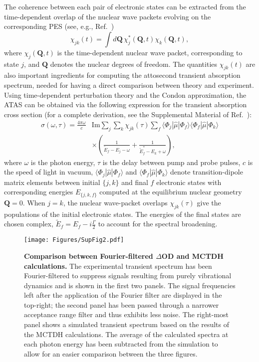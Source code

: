 \documentclass[12pt]{article}
\begin{document}
The coherence between each pair of electronic states can be extracted from the time-dependent overlap of the nuclear wave packets evolving on the corresponding PES (see, e.g., Ref.~\cite{despre2018charge})
%
\begin{equation}
\label{eq:coherence}
\chi_{jk}(t)=\int d \mathbf{Q}\, \chi^*_j(\mathbf{Q},t) \chi_k(\mathbf{Q},t),
\end{equation}  
%
where $\chi_j(\mathbf{Q},t)$ is the time-dependent nuclear wave packet, corresponding to state $j$, and $\mathbf{Q}$ denotes the nuclear degrees of freedom. The quantities $\chi_{jk}(t)$ are also important ingredients for computing the attosecond transient absorption spectrum, needed for having a direct comparison between theory and experiment. Using time-dependent perturbation theory and the Condon approximation, the ATAS can be obtained via the following expression for the transient absorption cross section (for a complete derivation, see the Supplemental Material of Ref.~\cite{golubev2020ATAS}): 
%
\begin{equation}
\label{eq:ATAS_cs}
\begin{split}
  \sigma (\omega,\tau) = \frac{4\pi\omega}{c} 
  & \text{Im} \sum_j \sum_k 
    \chi_{jk}(\tau)
    \sum_f \langle \Phi_j | \hat{\mu} | \Phi_f \rangle
           \langle \Phi_f | \hat{\mu} | \Phi_k \rangle \\ & \times \left(
      \frac{1}{\tilde{E}_f - E_j - \omega}
    + \frac{1}{\tilde{E}^*_f - E_k + \omega}
    \right),
\end{split}
\end{equation}
%
where $\omega$ is the photon energy, $\tau$ is the delay between pump and probe pulses, $c$ is the speed of light in vacuum, $\langle \Phi_j | \hat{\mu} | \Phi_f \rangle$ and $\langle \Phi_f | \hat{\mu} | \Phi_k \rangle$ denote transition-dipole matrix elements between initial $\{j,k\}$ and final $f$ electronic states with corresponding energies $E_{\{j,k,f\}}$ computed at the equilibrium nuclear geometry $\mathbf{Q}=0$. When $j=k$, the nuclear wave-packet overlaps $\chi_{jk}(\tau)$ give the populations of the initial electronic states. The energies of the final states are chosen complex, $\tilde{E}_f = E_f - i\frac{\Gamma}{2}$ to account for the spectral broadening. 

\begin{figure}[h!]
\texttt{[image: Figures/SupFig2.pdf]}
\caption{\label{comparison}\textbf{Comparison between Fourier-filtered $\Delta$OD and MCTDH calculations.} The experimental transient spectrum has been Fourier-filtered to suppress signals resulting from purely vibrational dynamics and is shown in the first two panels. The signal frequencies left after the application of the Fourier filter are displayed in the top-right; the second panel has been passed through a narrower acceptance range filter and thus exhibits less noise. The right-most panel shows a simulated transient spectrum based on the results of the MCTDH calculations. The average of the calculated spectra at each photon energy has been subtracted from the simulation to allow for an easier comparison between the three figures.}
\end{figure}
\end{document}

